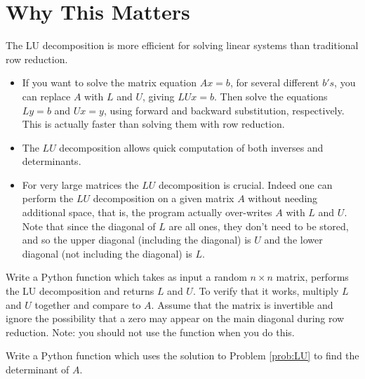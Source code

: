 \section*{Why This Matters}

The LU decomposition is more efficient for solving linear systems than traditional row reduction.
\begin{itemize}
\item If you want to solve the matrix equation $A x = b$, for several different $b's$, you can replace $A$ with $L$ and $U$, giving $L U x = b$.
Then solve the equations $L y = b$ and $U x = y$, using forward and backward substitution, respectively.
This is actually faster than solving them with row reduction.
\item The $LU$ decomposition allows quick computation of both inverses and determinants.
\item For very large matrices the $LU$ decomposition is crucial.
Indeed one can perform the $LU$ decomposition on a given matrix $A$ without needing additional space, that is, the program actually over-writes $A$ with $L$ and $U$.
Note that since the diagonal of $L$ are all ones, they don't need to be stored, and so the upper diagonal (including the diagonal) is $U$ and the lower diagonal (not including the diagonal) is $L$.
\end{itemize}

\begin{problem}
\label{prob:LU}
Write a Python function which takes as input a random $n\times n$ matrix, performs the LU decomposition and returns $L$ and $U$.
To verify that it works, multiply $L$ and $U$ together and compare to $A$.
Assume that the matrix is invertible and ignore the possibility that a zero may appear on the main diagonal during row reduction.
Note: you should not use the  function when you do this.
\end{problem}

\begin{problem}
\label{prob:det}
Write a Python function which uses the solution to Problem \ref{prob:LU} to find the determinant of $A$.
\end{problem}
